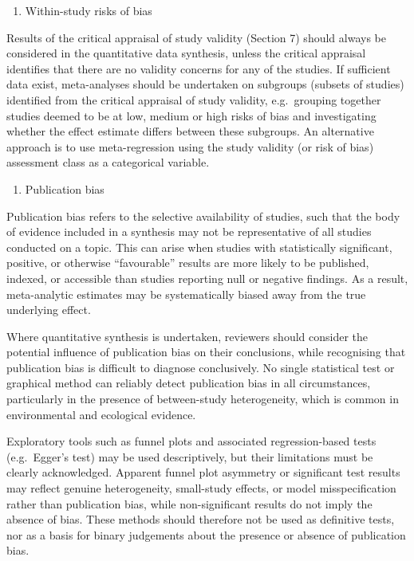 \documentclass[
  letterpaper,
  DIV=11,
  numbers=noendperiod]{scrreprt}
\providecommand{\tightlist}{%
  \setlength{\itemsep}{0pt}\setlength{\parskip}{0pt}}
\begin{document}
\begin{enumerate}
\def\labelenumi{(\roman{enumi})}
\tightlist
\item
  Within-study risks of bias
\end{enumerate}

Results of the critical appraisal of study validity (Section 7) should
always be considered in the quantitative data synthesis, unless the
critical appraisal identifies that there are no validity concerns for
any of the studies. If sufficient data exist, meta-analyses should be
undertaken on subgroups (subsets of studies) identified from the
critical appraisal of study validity, e.g.~grouping together studies
deemed to be at low, medium or high risks of bias and investigating
whether the effect estimate differs between these subgroups. An
alternative approach is to use meta-regression using the study validity
(or risk of bias) assessment class as a categorical variable.

\begin{enumerate}
\def\labelenumi{(\roman{enumi})}
\setcounter{enumi}{1}
\tightlist
\item
  Publication bias
\end{enumerate}

Publication bias refers to the selective availability of studies, such
that the body of evidence included in a synthesis may not be
representative of all studies conducted on a topic. This can arise when
studies with statistically significant, positive, or otherwise
``favourable'' results are more likely to be published, indexed, or
accessible than studies reporting null or negative findings. As a
result, meta-analytic estimates may be systematically biased away from
the true underlying effect.

Where quantitative synthesis is undertaken, reviewers should consider
the potential influence of publication bias on their conclusions, while
recognising that publication bias is difficult to diagnose conclusively.
No single statistical test or graphical method can reliably detect
publication bias in all circumstances, particularly in the presence of
between-study heterogeneity, which is common in environmental and
ecological evidence.

Exploratory tools such as funnel plots and associated regression-based
tests (e.g.~Egger's test) may be used descriptively, but their
limitations must be clearly acknowledged. Apparent funnel plot asymmetry
or significant test results may reflect genuine heterogeneity,
small-study effects, or model misspecification rather than publication
bias, while non-significant results do not imply the absence of bias.
These methods should therefore not be used as definitive tests, nor as a
basis for binary judgements about the presence or absence of publication
bias.
\end{document}
